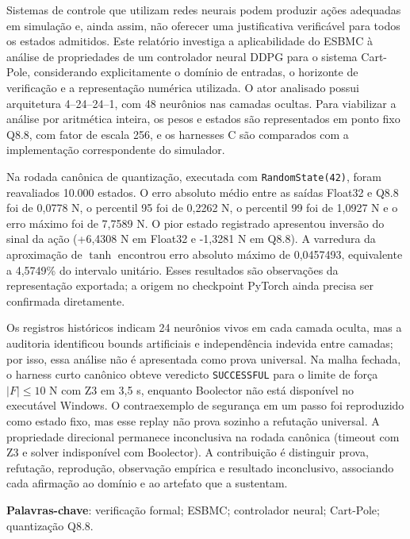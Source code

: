 \begin{resumo}
Sistemas de controle que utilizam redes neurais podem produzir ações adequadas em
simulação e, ainda assim, não oferecer uma justificativa verificável para todos os
estados admitidos. Este relatório investiga a aplicabilidade do ESBMC à análise de
propriedades de um controlador neural DDPG para o sistema Cart-Pole, considerando
explicitamente o domínio de entradas, o horizonte de verificação e a representação
numérica utilizada. O ator analisado possui arquitetura 4--24--24--1, com 48
neurônios nas camadas ocultas. Para viabilizar a análise por aritmética inteira,
os pesos e estados são representados em ponto fixo Q8.8, com fator de escala 256,
e os harnesses C são comparados com a implementação correspondente do simulador.

Na rodada canônica de quantização, executada com \texttt{RandomState(42)}, foram
reavaliados 10.000 estados. O erro absoluto médio entre as saídas Float32 e Q8.8
foi de 0,0778 N, o percentil 95 foi de 0,2262 N, o percentil 99 foi de 1,0927 N
e o erro máximo foi de 7,7589 N. O pior estado registrado apresentou inversão
do sinal da ação (+6,4308 N em Float32 e -1,3281 N em Q8.8). A varredura da
aproximação de $\tanh$ encontrou erro absoluto máximo de 0,0457493, equivalente
a 4,5749\% do intervalo unitário. Esses resultados são observações da
representação exportada; a origem no checkpoint PyTorch ainda precisa ser
confirmada diretamente.

Os registros históricos indicam 24 neurônios vivos em cada camada oculta, mas a
auditoria identificou bounds artificiais e independência indevida entre camadas;
por isso, essa análise não é apresentada como prova universal. Na malha fechada,
o harness curto canônico obteve veredicto \texttt{SUCCESSFUL} para o limite de força
$|F|\leq 10$ N com Z3 em 3,5 s,
enquanto Boolector não está disponível no executável Windows. O contraexemplo de
segurança em um passo foi reproduzido como estado fixo, mas esse replay não prova
sozinho a refutação universal. A propriedade direcional permanece inconclusiva
na rodada canônica (timeout com Z3 e solver indisponível com Boolector). A
contribuição é distinguir prova, refutação, reprodução, observação empírica e
resultado inconclusivo, associando cada afirmação ao domínio e ao artefato que a
sustentam.

\textbf{Palavras-chave}: verificação formal; ESBMC; controlador neural; Cart-Pole; quantização Q8.8.
\end{resumo}

